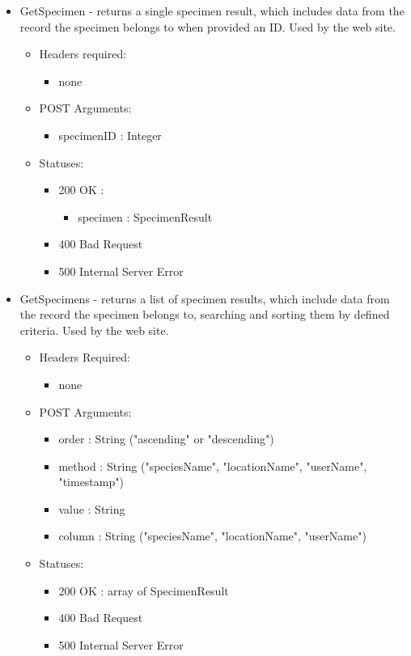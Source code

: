 \begin{itemize}
        \item GetSpecimen - returns a single specimen result, which includes data from the record the specimen belongs to when provided an ID. Used by the web site.
        \begin{itemize}
        \item Headers required: 
        \begin{itemize}
            \item none
        \end{itemize}
        \item POST Arguments:
        \begin{itemize}
        	\item specimenID : Integer
        \end{itemize}
        \item Statuses:
        \begin{itemize}
        	\item 200 OK :
            \begin{itemize}
                \item specimen : SpecimenResult
            \end{itemize}
        	\item 400 Bad Request
        	\item 500 Internal Server Error
        \end{itemize}
	    \end{itemize}

        \item GetSpecimens - returns a list of specimen results, which include data from the record the specimen belongs to, searching and sorting them by defined criteria. Used by the web site.
        \begin{itemize}
        \item Headers Required:
        \begin{itemize}
        	\item none
        \end{itemize}
        \item POST Arguments:
        \begin{itemize}
            \item order : String ("ascending" or "descending")
            \item method : String ("speciesName", "locationName", "userName", "timestamp")
            \item value : String
            \item column : String ("speciesName", "locationName", "userName")
        \end{itemize}
        \item Statuses: 
        \begin{itemize}
        	\item 200 OK : array of SpecimenResult
        	\item 400 Bad Request
        	\item 500 Internal Server Error
        \end{itemize}
	    \end{itemize}


\end{itemize}
